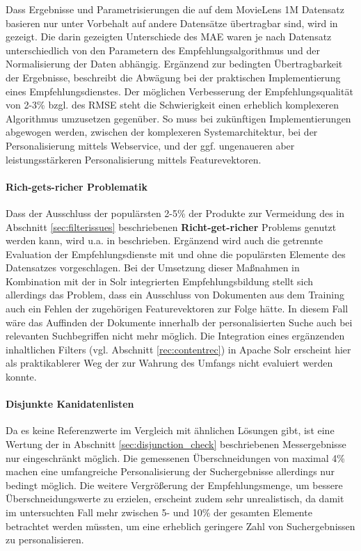 Dass Ergebnisse und Parametrisierungen die auf dem MovieLens 1M Datensatz basieren nur unter Vorbehalt auf andere Datensätze übertragbar sind, wird in \citep{Howe08} gezeigt. Die darin gezeigten Unterschiede des \acs{MAE} waren je nach Datensatz unterschiedlich von den Parametern des Empfehlungsalgorithmus und der Normalisierung der Daten abhängig. Ergänzend zur bedingten Übertragbarkeit der Ergebnisse, beschreibt \citep{netflix2012_2} die Abwägung bei der praktischen Implementierung eines Empfehlungsdienstes. Der möglichen Verbesserung der Empfehlungsqualität von 2-3\% bzgl. des \acs{RMSE} steht die 
Schwierigkeit einen erheblich komplexeren Algorithmus umzusetzen gegenüber. So muss bei zukünftigen Implementierungen abgewogen werden, zwischen der komplexeren Systemarchitektur, bei der Personalisierung mittels  Webservice, und der ggf. ungenaueren aber leistungsstärkeren Personalisierung mittels Featurevektoren.

\paragraph{Rich-gets-richer Problematik} Dass der Ausschluss der populärsten 2-5\% der Produkte zur Vermeidung des in Abschnitt \ref{sec:filterissues} beschriebenen \textbf{Richt-get-richer} Problems genutzt werden kann, wird u.a. in \citep{Cremonesi:2010:PRA:1864708.1864721} beschrieben. Ergänzend wird auch die getrennte Evaluation der Empfehlungsdienste mit und ohne die populärsten Elemente des Datensatzes vorgeschlagen. Bei der Umsetzung dieser Maßnahmen in Kombination mit der in Solr integrierten Empfehlungsbildung stellt sich allerdings das Problem, dass ein Ausschluss von Dokumenten aus dem Training auch ein Fehlen der zugehörigen Featurevektoren zur Folge hätte. In diesem Fall wäre das Auffinden der Dokumente innerhalb der personalisierten Suche auch bei relevanten Suchbegriffen nicht mehr möglich. Die Integration eines ergänzenden inhaltlichen Filters (vgl. Abschnitt \ref{rec:contentrec}) in Apache Solr erscheint hier als praktikablerer Weg der zur Wahrung des Umfangs nicht evaluiert werden konnte.

\paragraph{Disjunkte Kanidatenlisten} Da es keine Referenzwerte im Vergleich mit ähnlichen Lösungen gibt, ist eine Wertung der in Abschnitt \ref{sec:disjunction_check} beschriebenen Messergebnisse nur eingeschränkt möglich. Die gemessenen Überschneidungen von maximal 4\% machen eine umfangreiche Personalisierung der Suchergebnisse allerdings nur bedingt möglich. Die weitere Vergrößerung der Empfehlungsmenge, um bessere Überschneidungswerte zu erzielen, erscheint zudem sehr unrealistisch, da damit im untersuchten Fall mehr zwischen  5- und 10\% der gesamten Elemente betrachtet werden müssten, um eine erheblich geringere Zahl von Suchergebnissen zu personalisieren.

